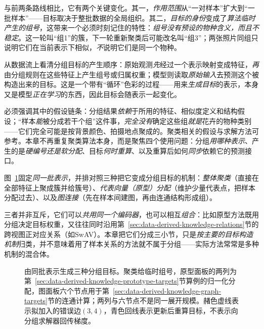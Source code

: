 与前两条路线相比，它有两个关键变化。其一，\emph{作用范围}从“一对样本”扩大到“一批样本”——目标取决于整批数据的全局组织。其二，\emph{目标的身份}变成了\emph{算法临时产生的组号}，这带来一个必须时刻记住的特性：\emph{组号没有预设的物种含义，而且不稳定}。这一轮叫“组1”的簇，下一轮重新聚类后可能改名叫“组3”；两张照片同组只说明它们在当前表示下相似，\emph{不}说明它们是同一个物种。

从数据流上看清分组目标的产生顺序：原始观测\emph{先}经过一个表示映射变成特征，\emph{再}由分组规则在这些特征上产生组号或归属权重；模型则读取\emph{原始输入}去预测这个被构造出来的目标。这是一个带有“循环”色彩的过程——用来\emph{生成目标}的表示，本身又是模型\emph{正在学习}的东西，因此目标会随表示一起变化。

必须强调其中的假设链条：分组结果\emph{依赖}于所用的特征、相似度定义和结构假设；“样本\emph{能}被分成若干个组”这件事，\emph{完全没有}确定这些组\emph{就是}花卉的物种类别——它们完全可能是按背景颜色、拍摄地点聚成的。聚类相关的假设与求解方法可参考。本章不再重复聚类算法本身，而是聚焦四个使用问题：分组\emph{用哪种表示}、产生的是\emph{硬编号还是软分配}、目标\emph{何时重算}、以及重算后如何\emph{同步}依赖它的预测接口。

图~\ref{fig:data-derived-knowledge-grouping-targets}固定\emph{同一批表示}，并排对照三种把它变成分组目标的机制：\emph{整体聚类}（直接在全部特征上聚成簇并给簇号）、\emph{代表向量（原型）分配}（维护少量代表点，把样本分配过去）、以及\emph{图连接}（先在样本间建图，再由连通结构形成组）。

三者并非互斥，它们可以\emph{共用同一个编码器}，也可以相互\emph{组合}：比如原型方法既用分组决定目标权重，又往往同时沿用第~\ref{sec:data-derived-knowledge-relations}节的跨视图正对应关系（如SwAV）。本章把它们分成三小节，只是\emph{按主要的目标构造机制}归类，并不意味着用了样本关系的方法就不属于分组——实际方法常常是多种机制的混合体。

\begin{figure}[!t]
  \centering
  
  \caption{由同批表示生成三种分组目标。聚类给临时组号，原型面板的两列为第~\ref{sec:data-derived-knowledge-prototype-targets}节算例的归一化分配，图面板六个节点用于第~\ref{sec:data-derived-knowledge-graph-targets}节的连通计算；两列与六节点不是同一展开规模。赭色虚线表示拟加入的错误边$(3,4)$，青色回线表示更新后重算目标，不表示向分组求解器回传梯度。}
  \label{fig:data-derived-knowledge-grouping-targets}
\end{figure}

